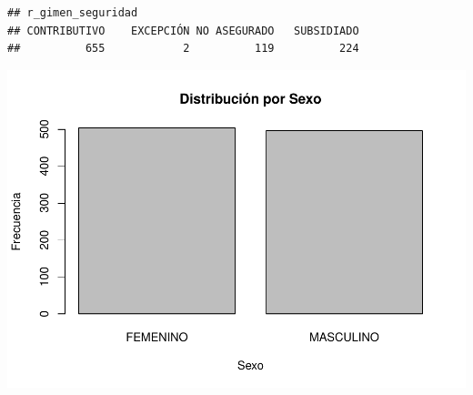 \documentclass[
]{book}
\begin{document}
\begin{verbatim}
## r_gimen_seguridad
## CONTRIBUTIVO    EXCEPCIÓN NO ASEGURADO   SUBSIDIADO 
##          655            2          119          224
\end{verbatim}

\includegraphics{bookdown-demo_files/figure-latex/analisisdesc-1.pdf} 
\end{document}
